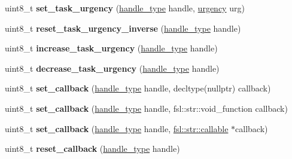 \begin{DoxyCompactItemize}
uint8\+\_\+t {\bfseries set\+\_\+task\+\_\+urgency} (\mbox{\hyperlink{classfsl_1_1lg_1_1range__int}{handle\+\_\+type}} handle, \mbox{\hyperlink{classfsl_1_1os_1_1urgency}{urgency}} urg)
\item 
\mbox{\label{classfsl_1_1os_1_1scheduler_aa7f4bedeeeff3e31d2dc9a3120749db7}} 
uint8\+\_\+t {\bfseries reset\+\_\+task\+\_\+urgency\+\_\+inverse} (\mbox{\hyperlink{classfsl_1_1lg_1_1range__int}{handle\+\_\+type}} handle)
\item 
\mbox{\label{classfsl_1_1os_1_1scheduler_af317f5f0e515e874922a2df75bdaa087}} 
uint8\+\_\+t {\bfseries increase\+\_\+task\+\_\+urgency} (\mbox{\hyperlink{classfsl_1_1lg_1_1range__int}{handle\+\_\+type}} handle)
\item 
\mbox{\label{classfsl_1_1os_1_1scheduler_a4865717251c8a58e81fe0ae62c4d3f28}} 
uint8\+\_\+t {\bfseries decrease\+\_\+task\+\_\+urgency} (\mbox{\hyperlink{classfsl_1_1lg_1_1range__int}{handle\+\_\+type}} handle)
\item 
\mbox{\label{classfsl_1_1os_1_1scheduler_a021357c07c8a9671cc4e44b066d55a46}} 
uint8\+\_\+t {\bfseries set\+\_\+callback} (\mbox{\hyperlink{classfsl_1_1lg_1_1range__int}{handle\+\_\+type}} handle, decltype(nullptr) callback)
\item 
\mbox{\label{classfsl_1_1os_1_1scheduler_a52076ea287916cd2fe68f1e6b2f03336}} 
uint8\+\_\+t {\bfseries set\+\_\+callback} (\mbox{\hyperlink{classfsl_1_1lg_1_1range__int}{handle\+\_\+type}} handle, fsl\+::str\+::void\+\_\+function callback)
\item 
\mbox{\label{classfsl_1_1os_1_1scheduler_a9300e21e56bc8e091b3efecceedf410b}} 
uint8\+\_\+t {\bfseries set\+\_\+callback} (\mbox{\hyperlink{classfsl_1_1lg_1_1range__int}{handle\+\_\+type}} handle, \mbox{\hyperlink{classfsl_1_1str_1_1callable}{fsl\+::str\+::callable}} $\ast$callback)
\item 
\mbox{\label{classfsl_1_1os_1_1scheduler_ad736993e4287e77963b0918b28f226be}} 
uint8\+\_\+t {\bfseries reset\+\_\+callback} (\mbox{\hyperlink{classfsl_1_1lg_1_1range__int}{handle\+\_\+type}} handle)

\end{DoxyCompactItemize}

